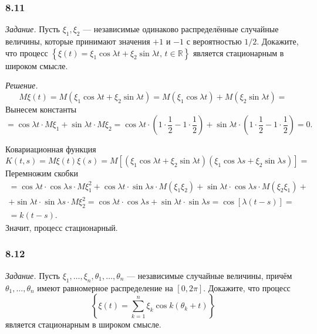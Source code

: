 \subsubsection*{8.11}

\textit{Задание.}
Пусть $ \xi_1, \xi_2$ --- независимые одинаково распределённые случайные величины,
которые принимают значения $+1$ и $-1$ с вероятностью $1 / 2$.
Докажите, что процесс
$ \left\{
  \xi \left( t \right) = \xi_1 \cos \lambda t + \xi_2 \sin \lambda t, \, t \in \mathbb{R} \right\} $
является стационарным в широком смысле.

\textit{Решение.}
$$M \xi \left( t \right) =
  M \left( \xi_1 \cos \lambda t + \xi_2 \sin \lambda t \right) =
  M \left( \xi_1 \cos \lambda t \right) + M \left( \xi_2 \sin \lambda t \right) =$$
Вынесем константы
$$= \cos \lambda t \cdot M \xi_1 + \sin \lambda t \cdot M \xi_2 =
  \cos \lambda t \cdot \left( 1 \cdot \frac{1}{2} - 1 \cdot \frac{1}{2} \right) +
  \sin \lambda t \cdot \left( 1 \cdot \frac{1}{2} - 1 \cdot \frac{1}{2} \right) =
  0.$$

Ковариационная функция
$$K \left( t, s \right) =
  M \xi \left( t \right) \xi \left( s \right) =
  M \left[
    \left( \xi_1 \cos \lambda t + \xi_2 \sin \lambda t \right)
    \left( \xi_1 \cos \lambda s + \xi_2 \sin \lambda s \right) \right] =$$
Перемножим скобки
\begin{gather*}
  = \cos \lambda t \cdot \cos \lambda s \cdot M \xi_1^2 +
  \cos \lambda t \cdot \sin \lambda s \cdot M \left( \xi_1 \xi_2 \right) +
  \sin \lambda t \cdot \cos \lambda s \cdot M \left( \xi_2 \xi_1 \right) + \\
  + \sin \lambda t \cdot \sin \lambda s \cdot M \xi_2^2 =
  \cos \lambda t \cdot \cos \lambda s + \sin \lambda t \cdot \sin \lambda s =
  \cos \left[ \lambda \left( t - s \right) \right] = \\
  = k \left( t - s \right).
\end{gather*}
Значит, процесс стационарный.

\subsubsection*{8.12}

\textit{Задание.}
Пусть $ \xi_1, \dotsc, \xi_n, \theta_1, \dotsc, \theta_n$ --- независимые случайные величины,
причём $ \theta_1, \dotsc, \theta_n$ имеют равномерное распределение на $ \left[ 0, 2 \pi \right] $.
Докажите, что процесс
$$ \left\{
    \xi \left( t \right) = \sum \limits_{k = 1}^n \xi_k \cos k \left( \theta_k + t \right)
  \right\} $$
является стационарным в широком смысле.

